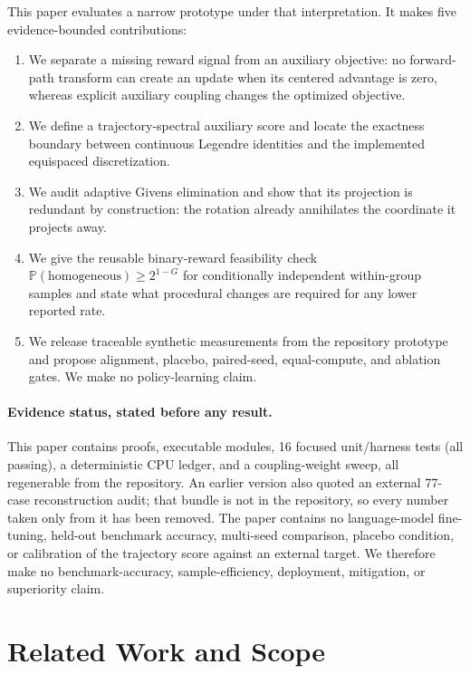 \documentclass{article}
\newcommand{\Prob}{\mathbb{P}}
\begin{document}
This paper evaluates a narrow prototype under that interpretation.  It makes
five evidence-bounded contributions:

\begin{enumerate}[leftmargin=*,itemsep=2pt]
  \item We separate a missing reward signal from an auxiliary objective: no
  forward-path transform can create an update when its centered advantage is
  zero, whereas explicit auxiliary coupling changes the optimized objective.
  \item We define a trajectory-spectral auxiliary score and locate the
  exactness boundary between continuous Legendre identities and the implemented
  equispaced discretization.
  \item We audit adaptive Givens elimination and show that its projection is
  redundant by construction: the rotation already annihilates the coordinate
  it projects away.
  \item We give the reusable binary-reward feasibility check
  $\Prob(\text{homogeneous})\geq 2^{1-G}$ for conditionally independent
  within-group samples and state what procedural changes are required for any
  lower reported rate.
  \item We release traceable synthetic measurements from the repository
  prototype and propose alignment, placebo, paired-seed, equal-compute, and
  ablation gates.  We make no policy-learning claim.
\end{enumerate}

\paragraph{Evidence status, stated before any result.}
This paper contains proofs, executable modules, 16 focused unit/harness tests
(all passing), a deterministic CPU ledger, and a coupling-weight sweep, all
regenerable from the repository.  An earlier version also quoted an external
77-case reconstruction audit; that bundle is not in the repository, so every
number taken only from it has been removed.  The paper contains no
language-model fine-tuning, held-out benchmark accuracy, multi-seed
comparison, placebo condition, or calibration of the trajectory score against
an external target.  We therefore make no benchmark-accuracy,
sample-efficiency, deployment, mitigation, or superiority claim.

\section{Related Work and Scope}
\end{document}
